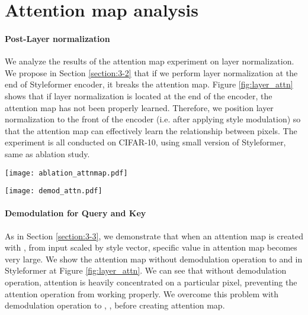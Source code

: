 \documentclass[10pt,twocolumn,letterpaper]{article}
\begin{document}
\section{Attention map analysis}
\label{app:B}
\paragraph{Post-Layer normalization}
We analyze the results of the attention map experiment on layer normalization. We propose in Section \ref{section:3-2} that if we perform layer normalization at the end of Styleformer encoder, it breaks the attention map. Figure \ref{fig:layer_attn} shows that if layer normalization is located at the end of the encoder, the attention map has not been properly learned. Therefore, we position layer normalization to the front of the encoder (i.e. after applying style modulation) so that the attention map can effectively learn the relationship between pixels. The experiment is all conducted on CIFAR-10, using small version of Styleformer, same as ablation study. 

\begin{figure*}[t]
\begin{center}
\texttt{[image: ablation\_attnmap.pdf]}
\end{center}
\vspace{-5mm}
\caption{
Comparison of attention map experimented based on Layer Normalization
}
\vspace{-3mm}
\label{fig:layer_attn}
\end{figure*}

\begin{figure*}[t]
\begin{center}
\texttt{[image: demod\_attn.pdf]}
\end{center}
\vspace{-5mm}
\caption{
Attention map without demodulation operation to query and key. Comparing with Figure \ref{fig:layer_attn} upper row, we can see specific large value in attention map.
}
\vspace{-3mm}
\label{fig:demod_attn}
\end{figure*}



\paragraph{Demodulation for Query and Key}
As in Section \ref{section:3-3}, we demonstrate that when an attention map is created with ,  from input scaled by style vector, specific value in attention map becomes very large. We show the attention map without demodulation operation to  and 
 in Styleformer at Figure \ref{fig:layer_attn}. We can see that without demodulation operation, attention is heavily concentrated on a particular pixel, preventing the attention operation from working properly. We overcome this problem with demodulation operation to , , before creating attention map. 
\end{document}
